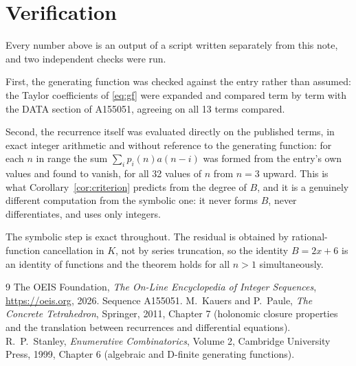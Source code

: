 \documentclass[11pt,a4paper]{article}
\theoremstyle{plain}
\theoremstyle{definition}
\begin{document}
\section{Verification}

Every number above is an output of a script written separately from this note, and two
independent checks were run.

First, the generating function was checked against the entry rather than assumed: the
Taylor coefficients of \eqref{eq:gf} were expanded and compared term by term with the DATA
section of A155051, agreeing on all 13 terms compared.

Second, the recurrence itself was evaluated directly on the published terms, in exact
integer arithmetic and without reference to the generating function: for each $n$ in range
the sum $\sum_{i}p_{i}(n)a(n-i)$ was formed from the entry's own values and found to
vanish, for all 32 values of $n$ from $n=3$ upward. This is what
Corollary~\ref{cor:criterion} predicts from the degree of $B$, and it is a genuinely
different computation from the symbolic one: it never forms $B$, never differentiates, and
uses only integers.

The symbolic step is exact throughout. The residual is obtained by rational-function
cancellation in $K$, not by series truncation, so the identity $B=2 x + 6$ is an
identity of functions and the theorem holds for all $n>1$ simultaneously.

\begin{thebibliography}{9}
 The OEIS Foundation, \emph{The On-Line Encyclopedia of Integer Sequences},
\url{https://oeis.org}, 2026. Sequence A155051.
 M.~Kauers and P.~Paule, \emph{The Concrete Tetrahedron}, Springer, 2011,
Chapter 7 (holonomic closure properties and the translation between recurrences and
differential equations).
 R.~P.~Stanley, \emph{Enumerative Combinatorics}, Volume 2, Cambridge
University Press, 1999, Chapter 6 (algebraic and D-finite generating functions).
\end{thebibliography}
\end{document}
